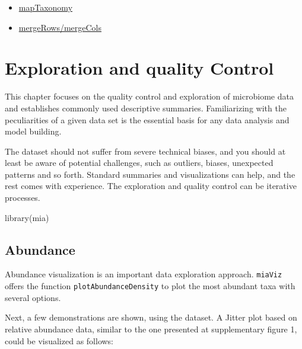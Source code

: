\documentclass[
]{book}
\newenvironment{Shaded}{\begin{snugshade}}{\end{snugshade}}
\newcommand{\FunctionTok}[1]{\textcolor[rgb]{0.00,0.00,0.00}{#1}}
\newcommand{\NormalTok}[1]{#1}
\providecommand{\tightlist}{%
  \setlength{\itemsep}{0pt}\setlength{\parskip}{0pt}}
\begin{document}
\begin{itemize}
\tightlist
\item
  \href{https://microbiome.github.io/mia/reference/taxonomy-methods.html}{mapTaxonomy}
\item
  \href{https://microbiome.github.io/mia/reference/merge-methods.html}{mergeRows/mergeCols}
\end{itemize}

\hypertarget{quality-control}{%
\chapter{Exploration and quality Control}\label{quality-control}}

This chapter focuses on the quality control and exploration of
microbiome data and establishes commonly used descriptive
summaries. Familiarizing with the peculiarities of a given data set is
the essential basis for any data analysis and model building.

The dataset should not suffer from severe technical biases, and you
should at least be aware of potential challenges, such as outliers,
biases, unexpected patterns and so forth. Standard summaries and
visualizations can help, and the rest comes with experience. The
exploration and quality control can be iterative processes.

\begin{Shaded}
\begin{Highlighting}[]
\FunctionTok{library}\NormalTok{(mia)}
\end{Highlighting}
\end{Shaded}

\hypertarget{abundance}{%
\section{Abundance}\label{abundance}}

Abundance visualization is an important data exploration
approach. \texttt{miaViz} offers the function \texttt{plotAbundanceDensity} to plot
the most abundant taxa with several options.

Next, a few demonstrations are shown, using the \citep{Lahti2014}
dataset. A Jitter plot based on relative abundance data, similar to
the one presented at \citep{Salosensaari2021} supplementary figure 1, could
be visualized as follows:
\end{document}
